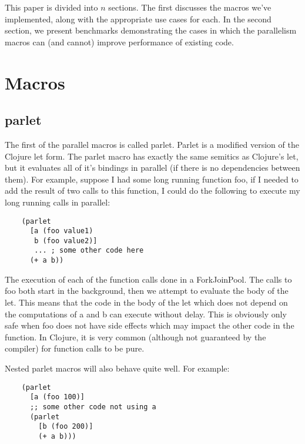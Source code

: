 \documentclass{article}
\begin{document}

This paper is divided into $n$ sections. The first discusses the macros we've implemented, along with the appropriate use cases for each. In the second section, we present benchmarks demonstrating the cases in which the parallelism macros can (and cannot) improve performance of existing code.

\section{Macros}
\subsection{parlet}
The first of the parallel macros is called parlet.
Parlet is a modified version of the Clojure let form.
The parlet macro has exactly the same semitics as Clojure's let, but it evaluates all of
it's bindings in parallel (if there is no dependencies between them).
For example, suppose I had some long running function foo, if I needed to add
the result of two calls to this function, I could do the following to execute my long running calls in parallel:

\begin{verbatim}
    (parlet
      [a (foo value1)
       b (foo value2)]
       ... ; some other code here
      (+ a b))
\end{verbatim}

The execution of each of the function calls done in a ForkJoinPool.
The calls to foo both start in the background, then we attempt to evaluate the body of the let.
This means that the code in the body of the let which does not depend on the computations of a and b can execute without delay.
This is obviously only safe when foo does not have side effects which may impact the other code in the function.
In Clojure, it is very common (although not guaranteed by the compiler) for function calls to be pure.

Nested parlet macros will also behave quite well.
For example:

\begin{verbatim}
    (parlet
      [a (foo 100)]
      ;; some other code not using a
      (parlet
        [b (foo 200)]
        (+ a b)))
\end{verbatim}
\end{document}
